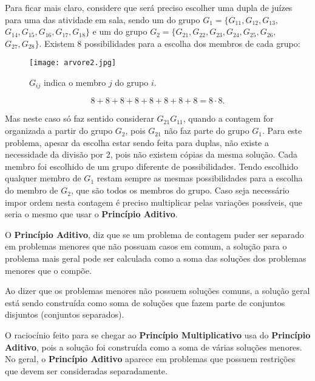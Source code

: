 Para ficar mais claro, considere que será preciso escolher uma dupla de juízes para uma das atividade em sala, sendo um do grupo $G_1=\{G_{11},G_{12},G_{13},$
$G_{14},G_{15},G_{16},G_{17},G_{18}\}$ e um do grupo $G_2=\{G_{21},G_{22},G_{23},
G_{24},G_{25},G_{26},$ $G_{27},G_{28}\}$. Existem 8 possibilidades para a escolha dos membros de cada grupo:


\begin{figure}[H]
\centering


\texttt{[image: arvore2.jpg]}
\caption{$G_{ij}$ indica o membro $j$ do grupo $i$.}
\end{figure}

 $$8+8+8+8+8+8+8+8=  8 \cdot 8.$$
 
Mas neste caso só faz sentido considerar $G_{21}G_{11}$, quando a contagem for organizada a partir do grupo $G_2$, pois $G_{21}$ não faz parte do grupo $G_1$. Para este problema, apesar da escolha estar sendo feita para duplas, não existe a necessidade da divisão por 2, pois não existem cópias da mesma solução. Cada membro foi escolhido de um grupo diferente de possibilidades. Tendo escolhido qualquer membro de $G_1$ restam sempre as mesmas possibilidades para a escolha do membro de $G_2$, que são todos os membros do grupo. Caso seja necessário impor ordem nesta contagem é preciso multiplicar pelas variações possíveis, que seria o mesmo que usar o \textbf{Princípio Aditivo}.

O \textbf{Princípio Aditivo}, diz que se um problema de contagem puder ser separado em problemas menores que não possuam casos em comum, a solução para o problema mais geral pode ser calculada como a soma das soluções dos problemas menores que o compõe. 

Ao dizer que os problemas menores não possuem soluções comuns, a solução geral está sendo construída como soma de soluções que fazem parte de conjuntos disjuntos (conjuntos separados). 

O raciocínio feito para se chegar ao \textbf{Princípio Multiplicativo}  usa do \textbf{Princípio   Aditivo},  pois a solução foi construída como a soma de várias soluções menores. No geral, o \textbf{Princípio Aditivo} aparece em problemas que possuem restrições que devem ser consideradas separadamente. 

